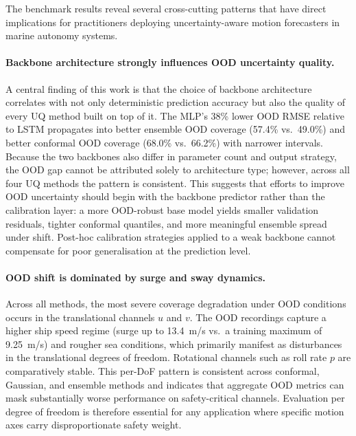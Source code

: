 \documentclass[a4paper,fleqn]{cas-sc}
\begin{document}
The benchmark results reveal several cross-cutting patterns that have direct implications for practitioners deploying uncertainty-aware motion forecasters in marine autonomy systems.

\paragraph{Backbone architecture strongly influences OOD uncertainty quality.}
A central finding of this work is that the choice of backbone architecture correlates with not only deterministic prediction accuracy but also the quality of every UQ method built on top of it. The MLP's 38\% lower OOD RMSE relative to LSTM propagates into better ensemble OOD coverage (57.4\% vs.\ 49.0\%) and better conformal OOD coverage (68.0\% vs.\ 66.2\%) with narrower intervals. Because the two backbones also differ in parameter count and output strategy, the OOD gap cannot be attributed solely to architecture type; however, across all four UQ methods the pattern is consistent. This suggests that efforts to improve OOD uncertainty should begin with the backbone predictor rather than the calibration layer: a more OOD-robust base model yields smaller validation residuals, tighter conformal quantiles, and more meaningful ensemble spread under shift. Post-hoc calibration strategies applied to a weak backbone cannot compensate for poor generalisation at the prediction level.

\paragraph{OOD shift is dominated by surge and sway dynamics.}
Across all methods, the most severe coverage degradation under OOD conditions occurs in the translational channels $u$ and $v$. The OOD recordings capture a higher ship speed regime (surge up to 13.4~m/s vs.\ a training maximum of 9.25~m/s) and rougher sea conditions, which primarily manifest as disturbances in the translational degrees of freedom. Rotational channels such as roll rate $p$ are comparatively stable. This per-DoF pattern is consistent across conformal, Gaussian, and ensemble methods and indicates that aggregate OOD metrics can mask substantially worse performance on safety-critical channels. Evaluation per degree of freedom is therefore essential for any application where specific motion axes carry disproportionate safety weight.
\end{document}
